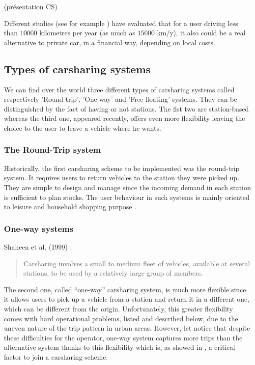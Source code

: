 \begin{bibunit}[ieeetr]
\cite{louvet_enquete_2013} (présentation CS)

Different studies (see for example \cite{litman_evaluating_2000, prettenthaler_ownership_1999}) have evaluated that for a user driving less than $10 000$ kilometres per year (as much as $15 000$ km/y), it also could be a real alternative to private car, in a financial way, depending on local costs.

\subsection{Types of carsharing systems}
We can find over the world three different types of carsharing systems called respectively 'Round-trip', 'One-way' and 'Free-floating' systems.
They can be distinguished by the fact of having or not stations.
The fist two are station-based whereas the third one, appeared recently, offers even more flexibility leaving the choice to the user to leave a vehicle where he wants.


\subsubsection{The Round-Trip system}
Historically, the first carsharing scheme to be implemented was the round-trip system.
It requires users to return vehicles to the station they were picked up.
They are simple to design and manage since the incoming demand in each station is sufficient to plan stocks.
The user behaviour in such systems is mainly oriented to leisure and household shopping purpose \cite{barth_shared_use_2002, costain_synopsis_2012}.


\subsubsection{One-way systems}
Shaheen et al. (1999) \cite{shaheen_short_1999}:
\begin{quote}
Carsharing involves a small to medium fleet of vehicles, available at several stations, to be used by a relatively large group of members.
\end{quote}
The second one, called ``one-way'' carsharing system, is much more flexible since it allows users to pick up a vehicle from a station and return it in a different one, which can be different from the origin.
Unfortunately, this greater flexibility comes with hard operational problems, listed and described below, due to the uneven nature of the trip pattern in urban areas.
However, let notice that despite these difficulties for the operator, one-way system captures more trips than the alternative system thanks to this flexibility which is, as showed in \cite{efthymiou_which_2012}, a critical factor to join a carsharing scheme.


\end{bibunit}
